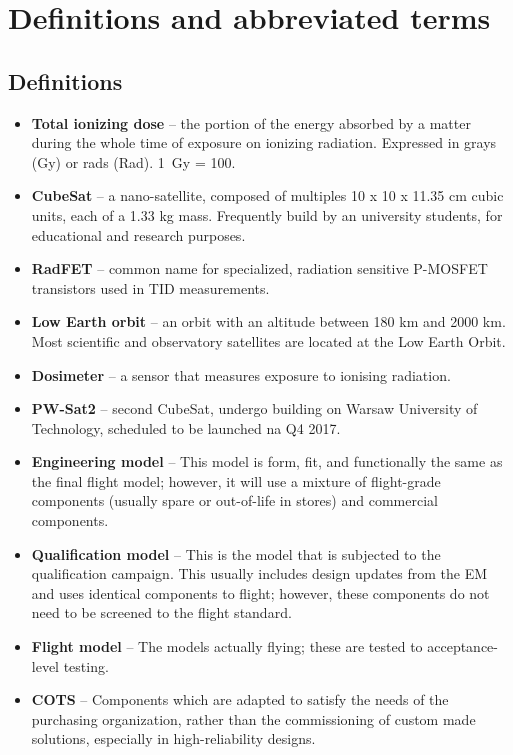 \chapter{Definitions and abbreviated terms}

\section{Definitions}
\begin{itemize}
    \item \textbf{Total ionizing dose} -- the portion of the energy absorbed by a matter during the whole time of exposure on ionizing radiation. \cite{RadFET_PhD} Expressed in grays (Gy) or rads (Rad). \SI{1}{Gy} = \SI{100}{\rad}.
    
    \item \textbf{CubeSat} -- a nano-satellite, composed of multiples 10 x 10 x 11.35 cm cubic units, each of a 1.33 kg mass. Frequently build by an university students, for educational and research purposes. \cite{CDS}
    
    \item \textbf{RadFET} -- common name for specialized, radiation sensitive P-MOSFET transistors used in TID measurements.
    
    \item \textbf{Low Earth orbit} -- an orbit with an altitude between 180 km and 2000 km. Most scientific and observatory satellites are located at the Low Earth Orbit. \cite{NASA_orbits}
    
    \item \textbf{Dosimeter} -- a sensor that measures exposure to ionising radiation.
    
    \item \textbf{PW-Sat2} -- second CubeSat, undergo building on Warsaw University of Technology, scheduled to be launched na Q4 2017.
    
    \item \textbf{Engineering model} -- This model is form, fit, and functionally the same as the final flight model; however, it will use a mixture of flight-grade components (usually spare or out-of-life in stores) and commercial components. \cite{Models_space}

    \item \textbf{Qualification model} -- This is the model that is subjected to the qualification campaign. This usually includes design updates from the EM and uses identical components to flight; however, these components do not need to be screened to the flight standard. \cite{Models_space}
    
    \item \textbf{Flight model} -- The models actually flying; these are tested to acceptance-level testing. \cite{Models_space}
    
    \item \textbf{COTS} --  Components which are adapted to satisfy the needs of the purchasing organization, rather than the commissioning of custom made solutions, especially in high-reliability designs.

\end{itemize}

